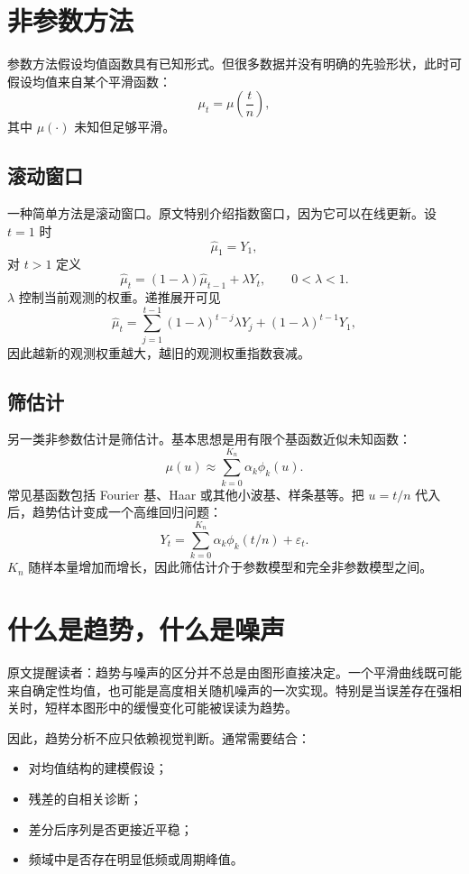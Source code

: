 \documentclass[11pt,a4paper]{ctexart}
\begin{document}
\section{非参数方法}

参数方法假设均值函数具有已知形式。但很多数据并没有明确的先验形状，此时可假设均值来自某个平滑函数：
\[
  \mu_t=\mu\left(\frac{t}{n}\right),
\]
其中 \(\mu(\cdot)\) 未知但足够平滑。

\subsection{滚动窗口}

一种简单方法是滚动窗口。原文特别介绍指数窗口，因为它可以在线更新。设 \(t=1\) 时
\[
  \hat{\mu}_1=Y_1,
\]
对 \(t>1\) 定义
\[
  \hat{\mu}_t=(1-\lambda)\hat{\mu}_{t-1}+\lambda Y_t,
  \qquad 0<\lambda<1.
\]
\(\lambda\) 控制当前观测的权重。递推展开可见
\[
  \hat{\mu}_t
  =\sum_{j=1}^{t-1}(1-\lambda)^{t-j}\lambda Y_j+(1-\lambda)^{t-1}Y_1,
\]
因此越新的观测权重越大，越旧的观测权重指数衰减。

\subsection{筛估计}

另一类非参数估计是筛估计。基本思想是用有限个基函数近似未知函数：
\[
  \mu(u)\approx \sum_{k=0}^{K_n}\alpha_k\phi_k(u).
\]
常见基函数包括 Fourier 基、Haar 或其他小波基、样条基等。把 \(u=t/n\) 代入后，趋势估计变成一个高维回归问题：
\[
  Y_t=\sum_{k=0}^{K_n}\alpha_k\phi_k(t/n)+\varepsilon_t.
\]
\(K_n\) 随样本量增加而增长，因此筛估计介于参数模型和完全非参数模型之间。

\section{什么是趋势，什么是噪声}

原文提醒读者：趋势与噪声的区分并不总是由图形直接决定。一个平滑曲线既可能来自确定性均值，也可能是高度相关随机噪声的一次实现。特别是当误差存在强相关时，短样本图形中的缓慢变化可能被误读为趋势。

因此，趋势分析不应只依赖视觉判断。通常需要结合：
\begin{itemize}
  \item 对均值结构的建模假设；
  \item 残差的自相关诊断；
  \item 差分后序列是否更接近平稳；
  \item 频域中是否存在明显低频或周期峰值。
\end{itemize}
\end{document}
